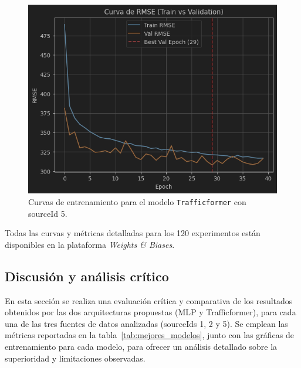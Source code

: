 \begin{figure}[H]
\begin{minipage}{0.48\textwidth}
		\vspace{0.2cm}
		\includegraphics[width=\linewidth]{includes/cap5/graphs/sid5_trafficformer_rmse.png}
	\end{minipage}
	\caption{Curvas de entrenamiento para el modelo \texttt{Trafficformer} con sourceId 5.}
	\label{fig:curvas_sid5_trafficformer}
\end{figure}

Todas las curvas y métricas detalladas para los 120 experimentos están disponibles en la plataforma \textit{Weights \& Biases}.


\subsection{Discusión y análisis crítico}
\label{sec:discusion_analisis}

En esta sección se realiza una evaluación crítica y comparativa de los resultados obtenidos por las dos arquitecturas propuestas (MLP y Trafficformer), para cada una de las tres fuentes de datos analizadas (sourceIds 1, 2 y 5). Se emplean las métricas reportadas en la tabla~\ref{tab:mejores_modelos}, junto con las gráficas de entrenamiento para cada modelo, para ofrecer un análisis detallado sobre la superioridad y limitaciones observadas.

